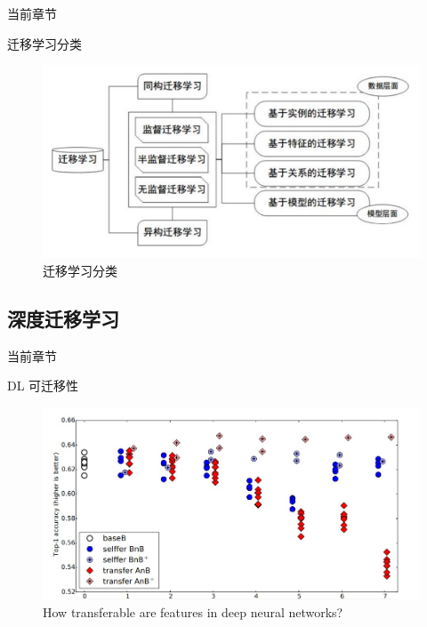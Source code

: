 \begin{frame}{当前章节}
\end{frame}

\begin{frame}{迁移学习分类}
    \begin{figure}
        \centering
        \includegraphics[width=\textwidth]{pic/pic05.jpg}
        \caption{迁移学习分类}
        \label{fig:05}
    \end{figure}
\end{frame}



\subsection{深度迁移学习}

\begin{frame}{当前章节}
\end{frame}

\begin{frame}{DL 可迁移性}
    \begin{figure}
        \centering
        \includegraphics[width=\textwidth]{pic/pic0201.jpg}
        \caption{How transferable are features in deep neural networks?}
        \label{fig:06}
    \end{figure}
    
\end{frame}

